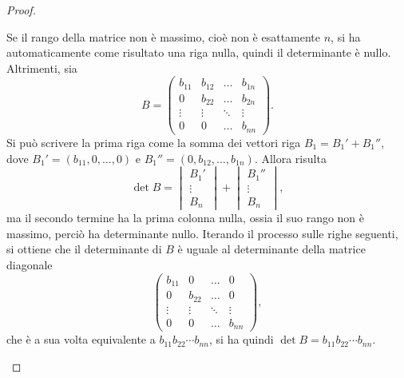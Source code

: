 \begin{proof}
\begin{enumerate}
		Se il rango della matrice non è massimo, cioè non è esattamente $n$, si ha automaticamente come risultato una riga nulla, quindi il determinante è nullo.
		Altrimenti, sia
		\begin{equation*}
			B=
			\begin{pmatrix}
				b_{11}	&b_{12}	&\dots	&b_{1n}\\
				0		&b_{22}	&\dots 	&b_{2n}\\
				\vdots 	&\vdots 	&\ddots 	&\vdots\\
				0		&0		&\dots 	&b_{nn}
			\end{pmatrix}.
		\end{equation*}
		Si può scrivere la prima riga come la somma dei vettori riga $B_1=B_1'+B_1''$, dove $B_1'=(b_{11},0,\dots,0)$ e $B_1''=(0,b_{12},\dots,b_{1n})$.
		Allora risulta
		\begin{equation*}
			\det B=
			\begin{vmatrix}
				B_1'\\\vdots\\B_n
			\end{vmatrix}
			+
			\begin{vmatrix}
				B_1''\\\vdots\\B_n
			\end{vmatrix},
		\end{equation*}
		ma il secondo termine ha la prima colonna nulla, ossia il suo rango non è massimo, perciò ha determinante nullo.
		Iterando il processo sulle righe seguenti, si ottiene che il determinante di $B$ è uguale al determinante della matrice diagonale
		\begin{equation*}
			\begin{pmatrix}
				b_{11}	&0		&\dots	&0\\
				0		&b_{22}	&\dots	&0\\
				\vdots 	&\vdots	&\ddots	&\vdots\\
				0		&0		&\dots	&b_{nn}
			\end{pmatrix},
		\end{equation*}
		che è a sua volta equivalente a $b_{11}b_{22}\cdots b_{nn}$, si ha quindi $\det B=b_{11}b_{22}\cdots b_{nn}$.
	\end{enumerate}
\end{proof}

